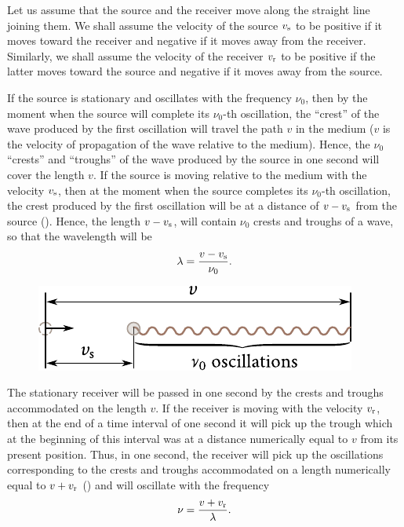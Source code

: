 Let us assume that the source and the receiver move along the straight line joining them.
We shall assume the velocity of the source $v_{\text{s}}$ to be positive if it moves toward the receiver and negative if it moves away from the receiver.
Similarly, we shall assume the velocity of the receiver $v_{\text{r}}$ to be positive if the latter moves toward the source and negative if it moves away from the source.

If the source is stationary and oscillates with the frequency $\nu_0$, then by the moment when the source will complete its $\nu_0$-th oscillation, the ``crest'' of the wave produced by the first oscillation will travel the path $v$ in the medium ($v$ is the velocity of propagation of the wave relative to the medium).
Hence, the $\nu_0$ ``crests'' and ``troughs'' of the wave produced by the source in one second will cover the length $v$.
If the source is moving relative to the medium with the velocity $v_{\text{s}}$, then at the moment when the source completes its $\nu_0$-th oscillation, the crest produced by the first oscillation will be at a distance of $v-v_{\text{s}}$ from the source ().
Hence, the length $v-v_{\text{s}}$, will contain $\nu_0$ crests and troughs of a wave, so that the wavelength will be
\begin{equation}\label{eq:14_77}
	\lambda = \frac{v - v_{\text{s}}}{\nu_0}.
\end{equation}

\begin{figure}[t]
	\begin{center}
		\includegraphics[scale=1]{figures/ch_14/fig_14_15.pdf}
		\caption[]{}
		\label{fig:14_15}
	\end{center}
	\vspace{-0.8cm}
\end{figure}

The stationary receiver will be passed in one second by the crests and troughs accommodated on the length $v$.
If the receiver is moving with the velocity $v_{\text{r}}$, then at the end of a time interval of one second it will pick up the trough which at the beginning of this interval was at a distance numerically equal to $v$ from its present position.
Thus, in one second, the receiver will pick up the oscillations corresponding to the crests and troughs accommodated on a length numerically equal to $v+v_{\text{r}}$ () and will oscillate with the frequency
\begin{equation*}
	\nu = \frac{v + v_{\text{r}}}{\lambda}.
\end{equation*}

